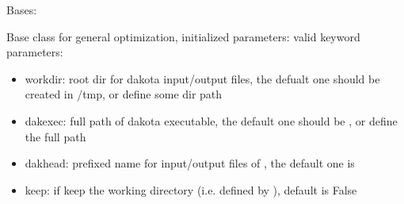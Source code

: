 \documentclass[letterpaper,10pt,english]{sphinxmanual}
\begin{document}
\begin{fulllineitems}
\label{\detokenize{src/apidocs/dakopt:genopt.dakopt.DakotaBase}}
Bases: \href{https://docs.python.org/2/library/functions.html\#object}{}

Base class for general optimization, initialized parameters:
valid keyword parameters:
\begin{itemize}
\item {} 
workdir: root dir for dakota input/output files,
the defualt one should be created in /tmp, or define some dir path

\item {} 
dakexec: full path of dakota executable,
the default one should be , or define the full path

\item {} 
dakhead: prefixed name for input/output files of , 
the default one is 

\item {} 
keep: if keep the working directory (i.e. defined by ), default is False

\end{itemize}

\begin{fulllineitems}
\label{\detokenize{src/apidocs/dakopt:genopt.dakopt.DakotaBase.dakexec}}
\end{fulllineitems}


\begin{fulllineitems}
\label{\detokenize{src/apidocs/dakopt:genopt.dakopt.DakotaBase.dakhead}}
\end{fulllineitems}


\begin{fulllineitems}
\label{\detokenize{src/apidocs/dakopt:genopt.dakopt.DakotaBase.keep}}
\end{fulllineitems}


\begin{fulllineitems}
\label{\detokenize{src/apidocs/dakopt:genopt.dakopt.DakotaBase.workdir}}
\end{fulllineitems}


\end{fulllineitems}
\end{document}
